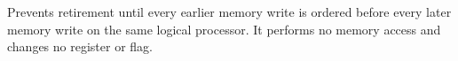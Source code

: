 Prevents retirement until every earlier memory write is ordered before every later memory write on the same logical processor. It performs no memory access and changes no register or flag.
